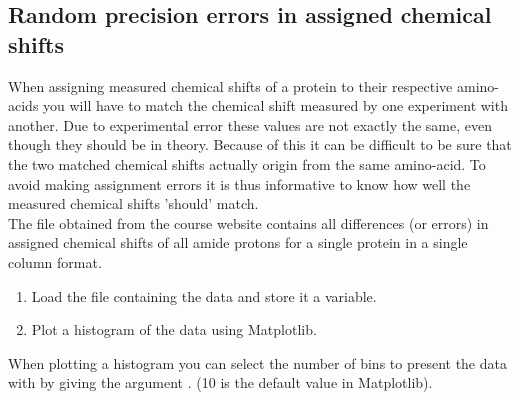 \documentclass{article}
\begin{document}
\newpage
\subsection{Random precision errors in assigned chemical shifts}

When assigning measured chemical shifts of a protein to their respective amino-acids you will have to match the chemical shift measured by one experiment with another.
Due to experimental error these values are not exactly the same, even though they should be in theory.
Because of this it can be difficult to be sure that the two matched chemical shifts actually origin from the same amino-acid.
To avoid making assignment errors it is thus informative to know how well the measured chemical shifts 'should' match.\\

The file  obtained from the course website contains all differences (or errors) in assigned chemical shifts of all amide protons for a single protein in a single column format.


\begin{enumerate}

    \item Load the file containing the data and store it a variable.

    \item Plot a histogram of the data using Matplotlib.

\end{enumerate}

When plotting a histogram you can select the number of bins to present the data with by giving the argument . (10 is the default value in Matplotlib).
%

%
%
\end{document}
